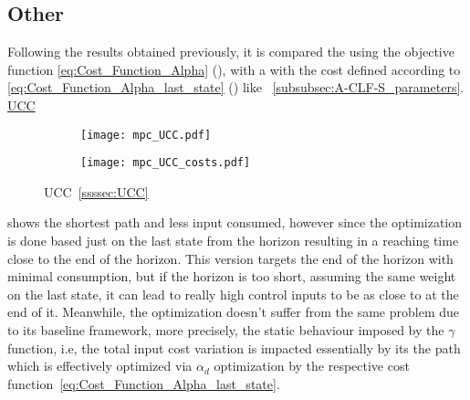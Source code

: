 \newpage %

\subsection{Other}
\label{subsec:other_experiments}

Following the results obtained previously, it is compared the  using the objective function \ref{eq:Cost_Function_Alpha} (), with a  with the cost defined according to \ref{eq:Cost_Function_Alpha_last_state} () like ~\ref{subsubsec:A-CLF-S_parameters}.\\

\underline{UCC}
\label{UCC_other_experiments} %


 \begin{figure}[htbp]
  \begin{subfigure}{0.5\textwidth}
    \centering
    \texttt{[image: mpc\_UCC.pdf]}
  \label{fig:mpc_UCC_CostEvol}
  \end{subfigure}
  \begin{subfigure}{0.6\textwidth}
    \centering
    \texttt{[image: mpc\_UCC\_costs.pdf]}
  \label{fig:mpc_UCC_trajectory}
  \end{subfigure}
  \caption{UCC~\ref{ssssec:UCC}}
\label{fig:mpc_UCCTrajectory_and_CostEvol}
\end{figure}


 shows the shortest path and less input consumed, however since the optimization is done based just on the last state from the horizon resulting in a reaching time close to the end of the horizon. This  version targets the end of the horizon with minimal consumption, but if the horizon is too short, assuming the same weight on the last state, it can lead to really high control inputs to be as close to \txtref at the end of it. Meanwhile, the  optimization doesn't suffer from the same problem due to its baseline framework, more precisely, the static behaviour imposed by the \(\gamma\) function, i.e, the total input cost variation is impacted essentially by its the path which is effectively optimized via \(\alpha_d\) optimization by the respective cost function~\ref{eq:Cost_Function_Alpha_last_state}.


